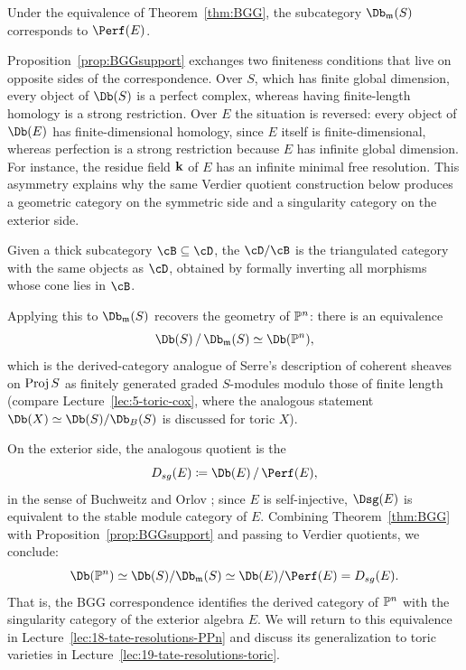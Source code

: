 \documentclass{amsart}
\begin{document}
\begin{prop}\label{prop:BGGsupport}
  Under the equivalence of Theorem~\ref{thm:BGG}, the subcategory $\Db_\m(S)$ corresponds to $\Perf(E)$.
\end{prop}


\begin{remark}\label{rem:BGGfiniteness}
  Proposition~\ref{prop:BGGsupport} exchanges two finiteness conditions that live on opposite sides of the correspondence. Over $S$, which has finite global dimension, every object of $\Db(S)$ is a perfect complex, whereas having finite-length homology is a strong restriction. Over $E$ the situation is reversed: every object of $\Db(E)$ has finite-dimensional homology, since $E$ itself is finite-dimensional, whereas perfection is a strong restriction because $E$ has infinite global dimension. For instance, the residue field ${\bf k}$ of $E$ has an infinite minimal free resolution. This asymmetry explains why the same Verdier quotient construction below produces a geometric category on the symmetric side and a singularity category on the exterior side.
\end{remark}

\begin{defn}
  Given a thick subcategory $\cB\subseteq \cD$, the  $\cD/\cB$ is the triangulated category with the same objects as $\cD$, obtained by formally inverting all morphisms whose cone lies in $\cB$.
\end{defn}

Applying this to $\Db_\m(S)$ recovers the geometry of $\mathbb P^n$: there is an equivalence
\[ \Db(S)\,/\,\Db_\m(S) \simeq \Db(\PP^n), \]
which is the derived-category analogue of Serre's description of coherent sheaves on $\operatorname{Proj} S$ as finitely generated graded $S$-modules modulo those of finite length (compare Lecture~\ref{lec:5-toric-cox}, where the analogous statement $\Db(X)\simeq \Db(S)/\Db_B(S)$ is discussed for toric $X$).

On the exterior side, the analogous quotient is the 
\[ D_{sg}(E) \ce \Db(E)\,/\,\Perf(E), \]
in the sense of Buchweitz and Orlov \cite{Buchweitz2021,Orlov09b}; since $E$ is self-injective, $\Dsg(E)$ is equivalent to the stable module category of $E$. Combining Theorem~\ref{thm:BGG} with Proposition~\ref{prop:BGGsupport} and passing to Verdier quotients, we conclude:
\[ \Db(\PP^n) \simeq \Db(S)/\Db_\m(S) \simeq \Db(E)/\Perf(E) = D_{sg}(E). \]
That is, the BGG correspondence identifies the derived category of $\mathbb P^n$ with the singularity category of the exterior algebra $E$. We will return to this equivalence in Lecture~\ref{lec:18-tate-resolutions-PPn} and discuss its generalization to toric varieties in Lecture~\ref{lec:19-tate-resolutions-toric}.
\end{document}
